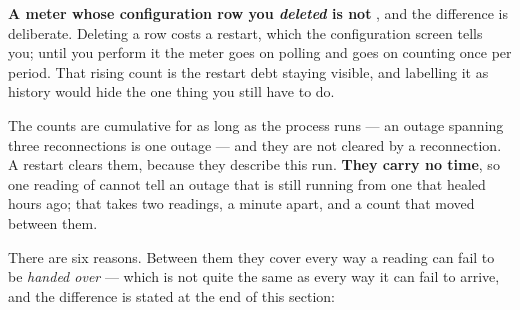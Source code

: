 \begin{warning}
\textbf{A meter whose configuration row you \emph{deleted} is not }, and the
difference is deliberate. Deleting a row costs a restart, which the configuration screen tells
you; until you perform it the meter goes on polling and goes on counting
 once per period. That rising count is the restart debt staying
visible, and labelling it as history would hide the one thing you still have to do.
\end{warning}

The counts are cumulative for as long as the process runs --- an outage spanning three
reconnections is one outage --- and they are not cleared by a reconnection. A restart clears
them, because they describe this run. \textbf{They carry no time}, so one reading of
 cannot tell an outage that is still running from one that healed hours ago;
that takes two readings, a minute apart, and a count that moved between them.

There are six reasons. Between them they cover every way a reading can fail to be
\emph{handed over} --- which is not quite the same as every way it can fail to arrive, and the
difference is stated at the end of this section:

